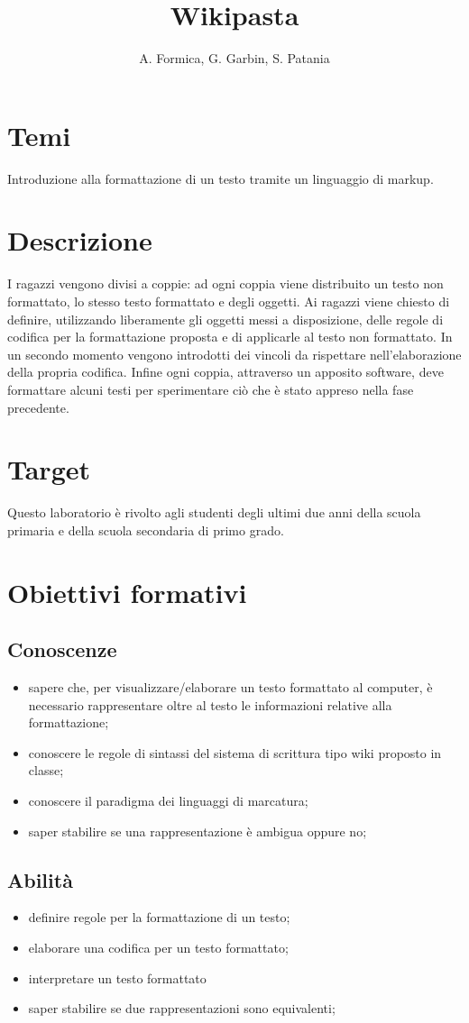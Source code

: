 \documentclass[12pt]{article}
\title{Wikipasta}
\author{A. Formica, G. Garbin, S. Patania}
\begin{document}
\maketitle
%
% 
\section{Temi}
Introduzione alla formattazione di un testo tramite un linguaggio di markup.
%
%
\section{Descrizione}
I ragazzi vengono divisi a coppie: ad ogni coppia viene distribuito un testo non formattato, lo stesso testo formattato e degli oggetti. Ai ragazzi viene chiesto di definire, utilizzando liberamente gli oggetti messi a disposizione, delle regole di codifica per la formattazione proposta e di applicarle al testo non formattato. In un secondo momento vengono introdotti dei vincoli da rispettare nell’elaborazione della propria codifica. Infine ogni coppia, attraverso un apposito software, deve formattare alcuni testi per sperimentare ciò che è stato appreso nella fase precedente.
%
%
\section{Target}
Questo laboratorio è rivolto agli studenti degli ultimi due anni della scuola primaria e della scuola secondaria di primo grado.
%
%
\section{Obiettivi formativi}
\subsection{Conoscenze}
\begin{itemize}
\item sapere che, per visualizzare/elaborare un testo formattato al computer, è necessario rappresentare oltre al testo le informazioni relative alla formattazione;
\item conoscere le regole di sintassi del sistema di scrittura tipo wiki proposto in classe;
\item conoscere il paradigma dei linguaggi di marcatura;
\item saper stabilire se una rappresentazione è ambigua oppure no;
\end{itemize}

\subsection{Abilità}
\begin{itemize}
\item definire regole per la formattazione di un testo;
\item elaborare una codifica per un testo formattato;
\item interpretare un testo formattato
\item saper stabilire se due rappresentazioni sono equivalenti;
\end{itemize}
\end{document}
